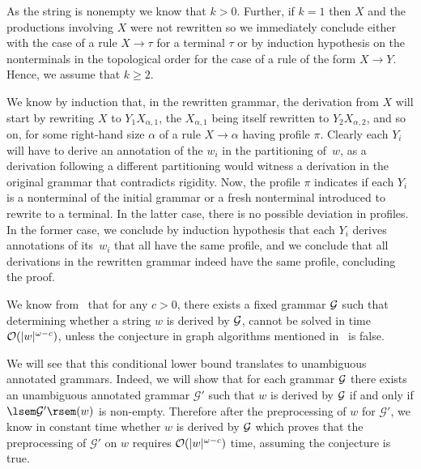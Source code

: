 As the string is nonempty we know that $k > 0$. Further, if $k = 1$ then $X$ and
the productions involving $X$ were not rewritten so we immediately conclude
either with the case of a rule $X \rightarrow \tau$ for a terminal $\tau$ or by
induction hypothesis on the nonterminals in the topological order for the case
of a rule of the form $X \rightarrow Y$. Hence, we assume that $k \geq 2$.

We know by induction that, in the rewritten grammar, the derivation from $X$
will start by rewriting $X$ to $Y_1 X_{\alpha, 1}$, the $X_{\alpha, 1}$ being
itself rewritten to $Y_2 X_{\alpha, 2}$, and so on, for some right-hand size
$\alpha$ of a rule $X \rightarrow \alpha$ having profile $\pi$. Clearly each
$Y_i$ will have to derive an annotation of the $w_i$ in the partitioning of~$w$, as
a derivation following a different partitioning would witness a derivation in
the original grammar that contradicts rigidity.
Now, the profile
$\pi$ indicates if each $Y_i$ is a nonterminal of the initial grammar or a fresh
nonterminal introduced to rewrite to a terminal. In the latter case, there is no
possible deviation in profiles. In the former case, we conclude by induction
hypothesis that each $Y_i$ derives annotations of its~$w_i$ that all have the
same profile, and we conclude that all derivations in the rewritten grammar
indeed have the same profile, concluding the proof.


%
%
%
%
%
%
%
%
%
%
%
%
%
%
%
%
%
%
%
%
%
%
%
%
%
%
%
%
%
%
%
%
%
%
%
%
%
%
%
%
%
%
%
%
%
%
%
%
%
%
%
%
%
%
%
%
%
%
%
%

%
%


%
%
%
%
%
%
%
%
%
%
%
%
%
%
%
%
%
%
%
%

%
%
%
%
%
%
%
%
%

%

%


%

We know from~\cite{AbboudBW18} that for any $c>0$, there exists a fixed
grammar $\mathcal{G}$ such that determining whether a string $w$ is
derived by $\mathcal{G}$, cannot be solved in time $\mathcal{O}(|w|^{\omega-c})$, unless the conjecture in graph algorithms mentioned in~\cite{AbboudBW18} is false.


We will see that this conditional lower bound translates to unambiguous
annotated grammars. Indeed, we will show that for each grammar
$\mathcal{G}$ there exists an unambiguous annotated grammar
$\mathcal{G}'$ such that $w$ is derived by $\mathcal{G}$ if and only
if $\sem{\mathcal{G}'}(w)$ is non-empty. Therefore after the
preprocessing of $w$ for $\mathcal{G}'$, we know in constant time
whether $w$ is derived by $\mathcal{G}$ which proves that the
preprocessing of $\mathcal{G}'$ on $w$ requires $\mathcal{O}(|w|^{\omega-c})$
time, assuming the conjecture is true.

